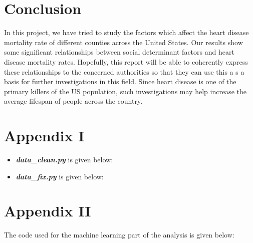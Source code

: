 \documentclass[journal,12pt,onecolumn]{IEEEtran}
\begin{document}
\section{Conclusion}
In this project, we have tried to study the factors which affect the heart disease mortality rate of different counties across the United States.
Our results show some significant relationships between social determinant factors and heart disease mortality rates.
Hopefully, this report will be able to coherently express these relationships to the concerned authorities so that they can use this a s a basis for further investigations in this field.
Since heart disease is one of the primary killers of the US population, such investigations may help increase the average lifespan of people across the country.

\newpage
\section*{Appendix I}
\begin{itemize}
\item \emph{\textbf{data\_clean.py}} is given below:


\item \emph{\textbf{data\_fix.py}} is given below:

  
\end{itemize}

\section*{Appendix II}
The code used for the machine learning part of the analysis is given below:

\end{document}
